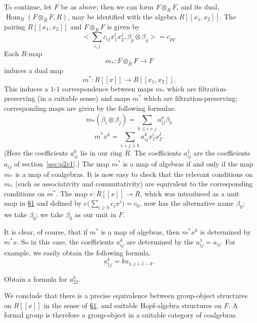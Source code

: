 \documentclass[../main]{subfiles}
\begin{document}
To continue, let $F$ be as above; then we can form $F\otimes_R F$, and its dual, $\operatorname{Hom}_R(F\otimes_R F, R)$, may be identified with the algebra $R[[x_1,x_2]]$. The pairing $R[[x_1,x_2]]$ and $F\otimes_R F$ is given by 
\begin{equation}
\label{eqn:p2c03.3}
\tag{3.3}    \Big<\sum_{i,j}c_{ij}x_1^ix_2^j, \beta_p\otimes\beta_q\Big> = c_{pq}.
\end{equation}
Each $R$-map
\[m_\ast:F\otimes_R F\longrightarrow F\]
induces a dual map
\[m^\ast:R[[x]]\longrightarrow R[[x_1,x_2]].\]
This induces a $1$-$1$ correspondence between maps $m_\ast$ which are filtration-preserving (in a suitable sense) and maps $m^\ast$ which are filtration-preserving; corresponding maps are given by the following formulae.
\begin{equation}
\label{eqn:p2c03.4}
\tag{3.4}
m_\ast(\beta_i\otimes\beta_j)=\sum_{k\leq i+j}a_{ij}^k\beta_k
\end{equation}
\begin{equation}
\label{eqn:p2c03.5}
\tag{3.5}
    m^\ast x^k=\sum_{i+j\geq k}a_{ij}^kx_1^ix_2^j.
\end{equation}
(Here the coefficients $a_{ij}^k$ lie in our ring $R$. The coefficients $a_{ij}^1$ are the coefficients $a_{ij}$ of section~\ref{sec:p2c1}.) The map $m^\ast$ is a map of algebras if and only if the map $m_\ast$ is a map of coalgebras. It is now easy to check that the relevant conditions on $m_\ast$ (such as associativity and commutativity) are equivalent to the corresponding conditions on $m^\ast$. The map $e:R[[x]]\longrightarrow R$, which was introduced as a unit map in \hyperref[sec:p2c1]{\S 1} and defined by $e\Big(\displaystyle \sum_{i\geq 0}c_ix^i\Big)=c_0$, now has the alternative name $\beta_0$; we take $\beta_0$; we take $\beta_0$ as our unit in $F$.

It is clear, of course, that if $m^\ast$ is a map of algebras, then $m^\ast x^k$ is determined by $m^\ast x$. So in this case, the coefficients $a_{ij}^k$ are determined by the $a_{ij}^1=a_{ij}$. For example, we easily obtain the following formula.
\begin{equation}
\label{eqn:p2c03.6}
\tag{3.6}
    a_{1j}^k = ka_{1,j+1-k}.
\end{equation}

\begin{exercise}
Obtain a formula for $a_{22}^k.$
\end{exercise}

We conclude that there is a precise equivalence between group-object structures on $R[[x]]$ in the sense of \hyperref[sec:p2c1]{\S 1}, and suitable Hopf-algebra structures on $F$. A formal group is therefore a group-object in a suitable category of coalgebras.
\end{document}
